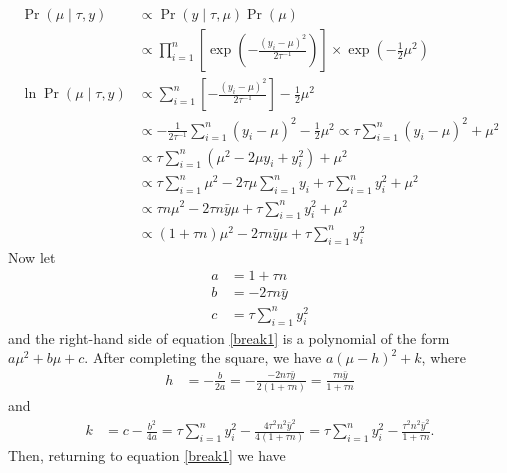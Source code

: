 \documentclass[letterpaper]{article}
\begin{document}
\begin{align}
\Pr(\mu\mid\tau, y)
    &\propto
    \Pr(y\mid\tau, \mu)
    \Pr(\mu)
    \\
    &\propto
    \prod_{i=1}^n
    \left[
    \exp\left(-\frac{\left(y_i-\mu\right)^2}{2\tau^{-1}}\right)
    \right]
    \times
    \exp\left(-\frac{1}{2}\mu^2\right)
    \\
    \ln
    \Pr(\mu\mid\tau, y)
    &\propto
    \sum_{i=1}^n
    \left[
    -\frac{\left(y_i-\mu\right)^2}{2\tau^{-1}}
    \right]
    -\frac{1}{2}\mu^2
    \\
    &\propto
    -\frac{1}{2\tau^{-1}}
    \sum_{i=1}^n
    \left(y_i-\mu\right)^2
    -\frac{1}{2}\mu^2
    \propto
    \tau
    \sum_{i=1}^n
    \left(y_i-\mu\right)^2
    +\mu^2
    \\
    &\propto
    \tau
    \sum_{i=1}^n
    \left(\mu^2-2\mu y_i + y_i^2\right)
    +\mu^2
    \\
    &\propto
    \tau \sum_{i=1}^n \mu^2
    -2\tau\mu\sum_{i=1}^n y_i
    + \tau \sum_{i=1}^n y_i^2
    +\mu^2
    \\
    &\propto
    \tau n \mu^2
    -2\tau n\bar{y}\mu
    + \tau \sum_{i=1}^n y_i^2
    +\mu^2
    \\
    &\propto
    \left(1+\tau n\right) \mu^2
    -2\tau n\bar{y}\mu
    + \tau \sum_{i=1}^n y_i^2 \label{break1}
\end{align}
Now let 
\begin{align}
    a &= 
    1+\tau n
    \\
    b &= 
    -2\tau n\bar{y}
    \\
    c &= 
    \tau \sum_{i=1}^n y_i^2
\end{align}
and the right-hand side of equation \ref{break1} is a polynomial of the form
$a\mu^2 + b\mu + c$.
After completing the square, we have
$a\left(\mu - h\right)^2+k$,
where
\begin{align}
    h &= -\frac{b}{2a}
    = -\frac{-2 n\tau\bar{y}}{2\left(1+\tau n\right)}
    = \frac{\tau n\bar{y}}{1+\tau n}
\end{align}
and
\begin{align}
    k &= c-\frac{b^2}{4a}
    = \tau \sum_{i=1}^n y_i^2
    -\frac{4\tau^2 n^2\bar{y}^2}{4\left(1+\tau n\right)}
    = \tau \sum_{i=1}^n y_i^2
    -\frac{\tau^2 n^2\bar{y}^2}{1+\tau n}.
\end{align}
Then, returning to equation \ref{break1} we have
\end{document}
